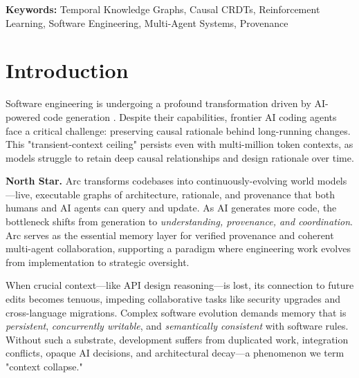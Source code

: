 \documentclass{article}
\begin{document}
\noindent\textbf{Keywords:} Temporal Knowledge Graphs, Causal CRDTs, Reinforcement Learning, Software Engineering, Multi-Agent Systems, Provenance


\section{Introduction}
Software engineering is undergoing a profound transformation driven by AI-powered code generation \cite{ref1, ref2}. Despite their capabilities, frontier AI coding agents face a critical challenge: preserving causal rationale behind long-running changes. This "transient-context ceiling" persists even with multi-million token contexts, as models struggle to retain deep causal relationships and design rationale over time.

\textbf{North Star.} Arc transforms codebases into continuously-evolving world models—live, executable graphs of architecture, rationale, and provenance that both humans and AI agents can query and update. As AI generates more code, the bottleneck shifts from generation to \textit{understanding, provenance, and coordination}. Arc serves as the essential memory layer for verified provenance and coherent multi-agent collaboration, supporting a paradigm where engineering work evolves from implementation to strategic oversight.

When crucial context—like API design reasoning—is lost, its connection to future edits becomes tenuous, impeding collaborative tasks like security upgrades and cross-language migrations. Complex software evolution demands memory that is \textit{persistent}, \textit{concurrently writable}, and \textit{semantically consistent} with software rules. Without such a substrate, development suffers from duplicated work, integration conflicts, opaque AI decisions, and architectural decay—a phenomenon we term "context collapse."
\end{document}

